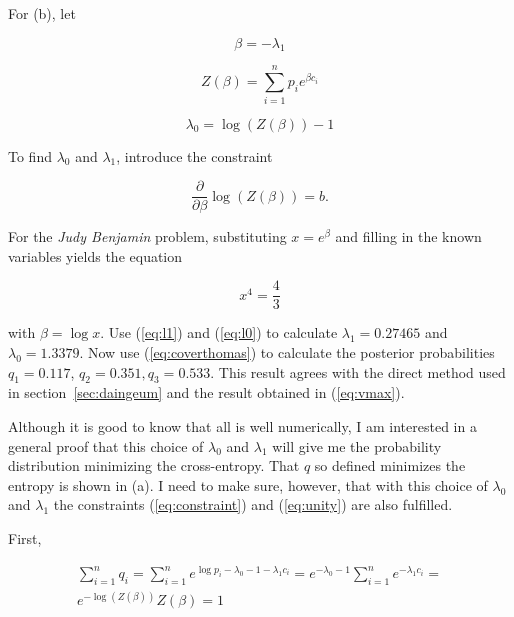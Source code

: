 \documentclass[phd,12pt,oneside]{ubcthesis}
\begin{document}
For (b), let

\begin{equation}
  \label{eq:l1}
\beta=-\lambda_{1}
\end{equation}

\begin{equation}
  \label{eq:zet}
Z(\beta)=\sum_{i=1}^{n}p_{i}e^{\beta{}c_{i}}
\end{equation}

\begin{equation}
  \label{eq:l0}
\lambda_{0}=\log(Z(\beta))-1
\end{equation}

{\noindent}To find $\lambda_{0}$ and $\lambda_{1}$, introduce the
constraint

\begin{equation}
  \label{eq:logcon}
\frac{\partial}{\partial{}\beta}\log(Z(\beta))=b.
\end{equation}

{\noindent}For the \emph{Judy Benjamin} problem, substituting
$x=e^{\beta}$ and filling in the known variables yields the equation

\begin{equation}
  \label{eq:aihuoque}
  x^{4}=\frac{4}{3}
\end{equation}

{\noindent}with $\beta=\log{}x$. Use (\ref{eq:l1}) and (\ref{eq:l0})
to calculate $\lambda_{1}=0.27465$ and $\lambda_{0}=1.3379$. Now use
(\ref{eq:coverthomas}) to calculate the posterior probabilities
$q_{1}=0.117$, $q_{2}=0.351,q_{3}=0.533$. This result agrees with the
direct method used in section~\ref{sec:daingeum} and the result
obtained in (\ref{eq:vmax}).

Although it is good to know that all is well numerically, I am
interested in a general proof that this choice of $\lambda_{0}$ and
$\lambda_{1}$ will give me the probability distribution minimizing the
cross-entropy. That $q$ so defined minimizes the entropy is shown in
(a). I need to make sure, however, that with this choice of
$\lambda_{0}$ and $\lambda_{1}$ the constraints
({\ref{eq:constraint}}) and ({\ref{eq:unity}}) are also fulfilled.

First, 

\begin{equation}
  \label{eq:unishow}
  \begin{array}{l}
\displaystyle \sum_{i=1}^{n}q_{i}=\sum_{i=1}^{n}e^{\log{}p_{i}-\lambda_{0}-1-\lambda_{1}c_{i}}=e^{-\lambda_{0}-1}\sum_{i=1}^{n}e^{-\lambda_{1}c_{i}}= \\
\displaystyle e^{-\log(Z(\beta))}Z(\beta)=1 \\
  \end{array}
\end{equation}
\end{document}
